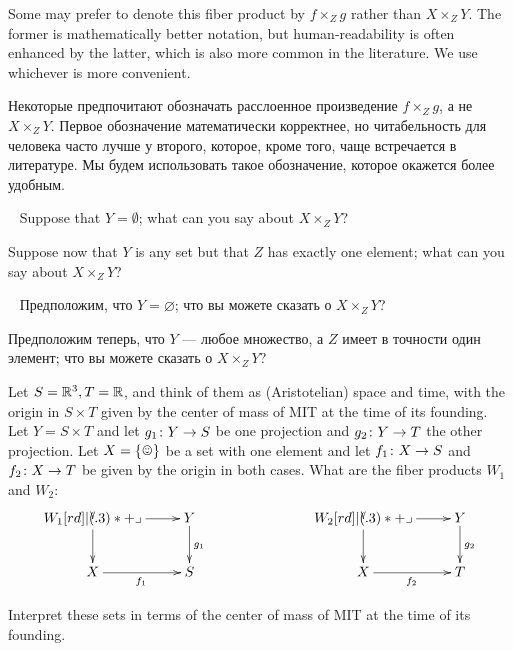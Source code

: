 \begin{remarkENG}
Some may prefer to denote this fiber product by $f\times_Zg$ rather than $X\times_ZY$. The former is  mathematically better notation, but human-readability is often enhanced by the latter, which is also more common in the literature. We use whichever is more convenient.
\end{remarkENG}

\begin{remarkRUS}
Некоторые предпочитают обозначать расслоенное произведение $f\times_Zg$, а не $X\times_ZY$. Первое обозначение математически корректнее, но читабельность для человека часто лучше у второго, которое, кроме того, чаще встречается в литературе. Мы будем использовать такое обозначение, которое окажется более удобным.
\end{remarkRUS}

\begin{exerciseENG}~
\sexc Suppose that $Y=\emptyset$; what can you say about $X\times_ZY$? 
\item Suppose now that $Y$ is any set but that $Z$ has exactly one element; what can you say about $X\times_ZY$?
\endsexc
\end{exerciseENG}

\begin{exerciseRUS}~
\sexc Предположим, что $Y=\varnothing$; что вы можете сказать о $X\times_ZY$? 
\item Предположим теперь, что $Y$ — любое множество, а $Z$ имеет в точности один элемент; что вы можете сказать о $X\times_ZY$?
\endsexc
\end{exerciseRUS}

\begin{exerciseENG}
Let $S={\mathbb R}^3, T={\mathbb R}$, and think of them as (Aristotelian) space and time, with the origin in $S\times T$ given by the center of mass of MIT at the time of its founding. Let $Y=S\times T$ and let $g_1\colon Y\rightarrow S$ be one projection and $g_2\colon Y\rightarrow T$ the other projection. Let $X=\singleton$ be a set with one element and let $f_1\colon X\rightarrow S$ and $f_2\colon X\rightarrow T$ be given by the origin in both cases. 
\sexc What are the fiber products $W_1$ and $W_2$:
$$
\xymatrix{W_1\ar[r]\ar[d]\ullimit&Y\ar[d]^{g_1}\\X\ar[r]_{f_1}&S}\hspace{1in}
\xymatrix{W_2\ar[r]\ar[d]\ullimit&Y\ar[d]^{g_2}\\X\ar[r]_{f_2}&T}
$$
\item Interpret these sets in terms of the center of mass of MIT at the time of its founding.
\endsexc
\end{exerciseENG}

